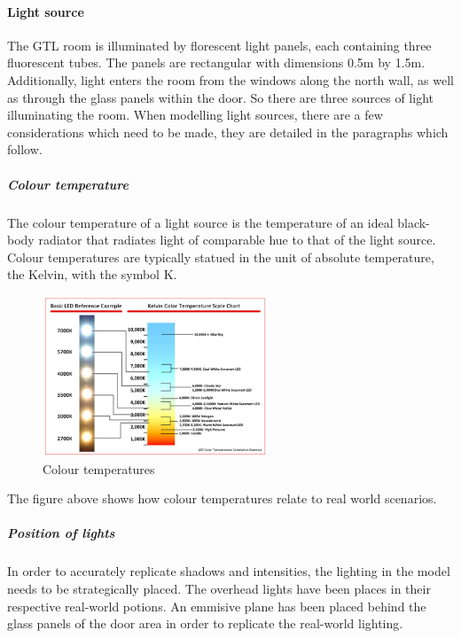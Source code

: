 \documentclass[11pt,a4paper]{report}
\begin{document}
				\paragraph{Light source}
					The GTL room is illuminated by florescent light panels, each containing three fluorescent tubes. The panels are rectangular with dimensions 0.5m by 1.5m. Additionally, light enters the room from the windows along the north wall, as well as through the glass panels within the door. So there are three sources of light illuminating the room. When modelling light sources, there are a few considerations which need to be made, they are detailed in the paragraphs which follow.
					\subparagraph{Colour temperature}
						The colour temperature of a light source is the temperature of an ideal black-body radiator that radiates light of comparable hue to that of the light source. Colour temperatures are typically statued in the unit of absolute temperature, the Kelvin, with the symbol K.
						\begin{figure}[h!]
							\centering
							\includegraphics[width=0.6\textwidth]{colour_temperature}
							\caption{Colour temperatures}
						\end{figure}
						The figure above shows how colour temperatures relate to real world scenarios.
				
					\subparagraph{Position of lights}
						In order to accurately replicate shadows and intensities, the lighting in the model needs to be strategically placed. The overhead lights have been places in their respective real-world potions. An emmisive plane has been placed behind the glass panels of the door area in order to replicate the real-world lighting.
						
\end{document}
